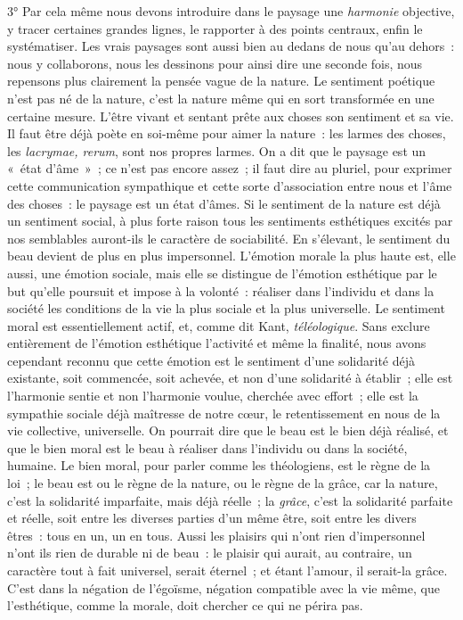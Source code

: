 \documentclass[french,twoside]{book} %
\begin{document}
3° Par cela même nous devons introduire dans le paysage une \emph{harmonie} objective, y tracer certaines grandes lignes, le rapporter à des points centraux, enfin le systématiser. Les vrais paysages sont aussi bien au dedans de nous qu’au dehors : nous y collaborons, nous les dessinons pour ainsi dire une seconde fois, nous repensons plus clairement la pensée vague de la nature. Le sentiment poétique n’est pas né de la nature, c’est la nature même qui en sort transformée en une certaine mesure. L’être vivant et sentant prête aux choses son sentiment et sa vie. Il faut être déjà poète en soi-même pour aimer la nature : les larmes des choses, les \emph{lacrymae, rerum}, sont nos propres larmes. On a dit que le paysage est un « état d’âme » ; ce n’est pas encore assez ; il faut dire au pluriel, pour exprimer cette communication sympathique et cette sorte d’association entre nous et l’âme des choses : le paysage est un état d’âmes. Si le sentiment de la nature est déjà un sentiment social, à plus forte raison tous les sentiments esthétiques excités par nos semblables auront-ils le caractère de sociabilité. En s’élevant, le sentiment du beau devient de plus en plus impersonnel. L’émotion morale la plus haute est, elle aussi, une émotion sociale, mais elle se distingue de l’émotion esthétique par le but qu’elle poursuit et impose à la volonté : réaliser dans l’individu et dans la société les conditions de la vie la plus sociale et la plus universelle. Le sentiment moral est essentiellement actif, et, comme dit Kant, \emph{téléologique}. Sans exclure entièrement de l’émotion esthétique l’activité et même la finalité, nous avons cependant reconnu que cette émotion est le sentiment d’une solidarité déjà existante, soit commencée, soit achevée, et non d’une solidarité à établir ; elle est l’harmonie sentie et non l’harmonie voulue, cherchée avec effort ; elle est la sympathie sociale déjà maîtresse de notre cœur, le retentissement en nous de la vie collective, universelle. On pourrait dire que le beau est le bien déjà réalisé, et que le bien moral est le beau à réaliser dans l’individu ou dans la société, humaine. Le bien moral, pour parler comme les théologiens, est le règne de la loi ; le beau est ou le règne de la nature, ou le règne de la grâce, car la nature, c’est la solidarité imparfaite, mais déjà réelle ; la \emph{grâce}, c’est la solidarité parfaite et réelle, soit entre les diverses parties d’un même être, soit entre les divers êtres : tous en un, un en tous. Aussi les plaisirs qui n’ont rien d’impersonnel n’ont ils rien de durable ni de beau : le plaisir qui aurait, au contraire, un caractère tout à fait universel, serait éternel ; et étant l’amour, il serait-la grâce. C’est dans la négation de l’égoïsme, négation compatible avec la vie même, que l’esthétique, comme la morale, doit chercher ce qui ne périra pas.
\end{document}
